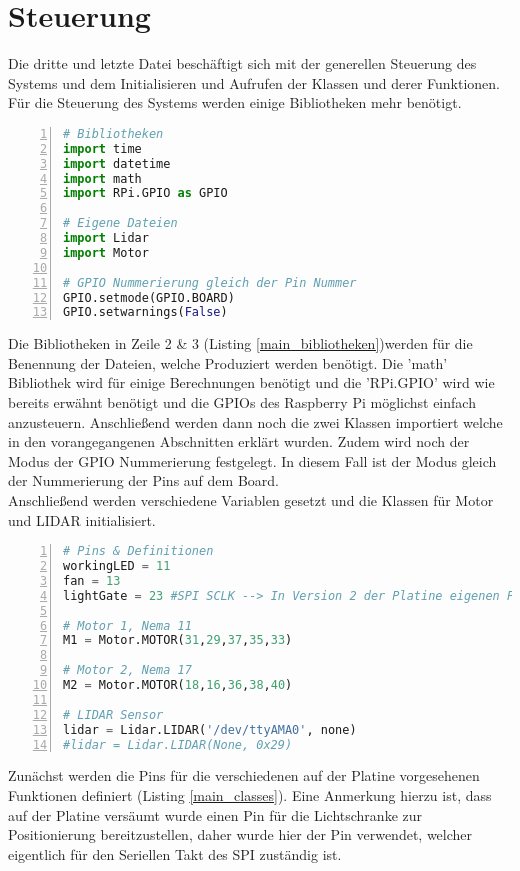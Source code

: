 \section{Steuerung}
Die dritte und letzte Datei beschäftigt sich mit der generellen Steuerung des Systems und dem Initialisieren und Aufrufen der Klassen und derer Funktionen.\\
Für die Steuerung des Systems werden einige Bibliotheken mehr benötigt.
\begin{lstlisting}[caption={Bibliotheken zur Steuerung des Systems}, language={Python}, label={main_bibliotheken}, numbers=left]
# Bibliotheken
import time
import datetime
import math
import RPi.GPIO as GPIO

# Eigene Dateien
import Lidar
import Motor

# GPIO Nummerierung gleich der Pin Nummer
GPIO.setmode(GPIO.BOARD)
GPIO.setwarnings(False)
\end{lstlisting}
Die Bibliotheken in Zeile 2 \& 3 (Listing \ref{main_bibliotheken})werden für die Benennung der Dateien, welche Produziert werden benötigt. Die 'math' Bibliothek wird für einige Berechnungen benötigt und die 'RPi.GPIO' wird wie bereits erwähnt benötigt und die \acp{GPIO} des Raspberry Pi möglichst einfach anzusteuern. Anschließend werden dann noch die zwei Klassen importiert welche in den vorangegangenen Abschnitten erklärt wurden. Zudem wird noch der Modus der \ac{GPIO} Nummerierung festgelegt. In diesem Fall ist der Modus gleich der Nummerierung der Pins auf dem Board. \\
Anschließend werden verschiedene Variablen gesetzt und die Klassen für Motor und \ac{LIDAR} initialisiert. 
\begin{lstlisting}[caption={Initialisieren von Variablen und Klassen}, language={Python}, label={main_classes}, numbers=left]
# Pins & Definitionen
workingLED = 11
fan = 13
lightGate = 23 #SPI SCLK --> In Version 2 der Platine eigenen Pin zuweisen

# Motor 1, Nema 11
M1 = Motor.MOTOR(31,29,37,35,33)

# Motor 2, Nema 17
M2 = Motor.MOTOR(18,16,36,38,40)

# LIDAR Sensor
lidar = Lidar.LIDAR('/dev/ttyAMA0', none)
#lidar = Lidar.LIDAR(None, 0x29)
\end{lstlisting}
Zunächst werden die Pins für die verschiedenen auf der Platine vorgesehenen Funktionen definiert (Listing \ref{main_classes}). Eine Anmerkung hierzu ist, dass auf der Platine versäumt wurde einen Pin für die Lichtschranke zur Positionierung bereitzustellen, daher wurde hier der Pin verwendet, welcher eigentlich für den Seriellen Takt des \ac{SPI} zuständig ist. \\
